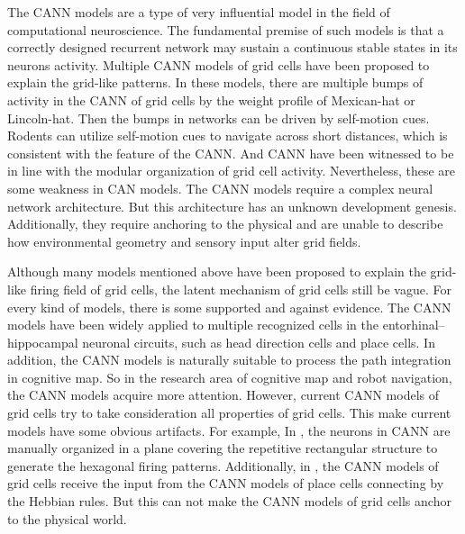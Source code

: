 \documentclass[final,5p,times,twocolumn]{elsarticle}
\begin{document}
The CANN models are a type of very influential model in the field of computational neuroscience. The fundamental premise of such models is that a correctly designed recurrent network may sustain a continuous stable states in its neurons activity\citep{Taylor1999,Amari1977}. Multiple CANN models of grid cells have been proposed to explain the grid-like patterns\citep{Fuhs2006,Burak2009,Guanella2007,Shipston-Sharman2016,Couey2013}. In these models, there are multiple bumps of activity in the CANN of grid cells by the weight profile of Mexican-hat or Lincoln-hat\citep{Rowland2016}. Then the bumps in networks can be driven by self-motion cues. Rodents can utilize self-motion cues to navigate across short distances, which is consistent with the feature of the CANN. And CANN have been witnessed to be in line with the modular organization of grid cell activity\citep{Stensola2012,Yoon2013}. Nevertheless, these are some weakness in CAN models. The CANN models require a complex neural network architecture. But this architecture has an unknown development genesis. Additionally, they require anchoring to the physical and are unable to describe how environmental geometry and sensory input alter grid fields\citep{DAlbis2017}.

Although many models mentioned above have been proposed to explain the grid-like firing field of grid cells, the latent mechanism of grid cells still be vague. For every kind of models, there is some supported and against evidence. The CANN models have been widely applied to multiple recognized cells in the entorhinal–hippocampal neuronal circuits, such as head direction cells and place cells. In addition, the CANN models is naturally suitable to process the path integration in cognitive map. So in the research area of cognitive map and robot navigation, the CANN models acquire more attention. However, current CANN models of grid cells try to take consideration all properties of grid cells. This make current models have some obvious artifacts. For example, In \citep{Guanella2007}, the neurons in CANN are manually organized in a plane covering the repetitive rectangular structure to generate the hexagonal firing patterns. Additionally, in \citep{Guanella2007}, the CANN models of grid cells receive the input from the CANN models of place cells connecting by the Hebbian rules. But this can not make the CANN models of grid cells anchor to the physical world\citep{DAlbis2017}.
\end{document}
